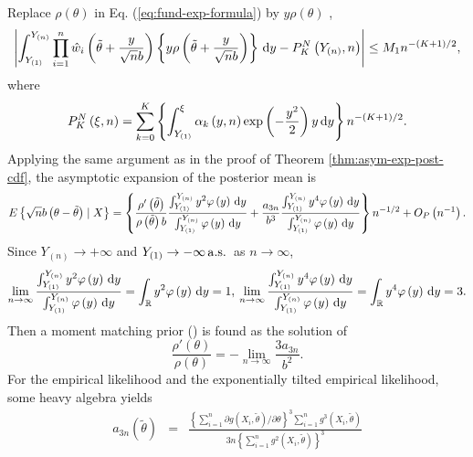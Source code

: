 \begin{example}
Replace $\rho\left(\theta\right)$ in Eq. (\ref{eq:fund-exp-formula})
by $y\rho\left(\theta\right)$ , 
\[
\left|\int_{Y_{\left(1\right)}}^{Y_{\left(n\right)}}\prod_{i=1}^{n}\hat{w}_{i}\left(\tilde{\theta}+\frac{y}{\sqrt{n}b}\right)\left\{ y\rho\left(\tilde{\theta}+\frac{y}{\sqrt{n}b}\right)\right\} \,\mathrm{d} y-P_{K}^{N}\left(Y_{\left(n\right)},n\right)\right|\le M_{1}n^{-\left(K+1\right)/2},
\]
where 
\[
P_{K}^{N}\left(\xi,n\right)=\sum_{k=0}^{K}\left\{ \int_{Y_{\left(1\right)}}^{\xi}\alpha_{k}\left(y,n\right)\exp\left(-\frac{y^{2}}{2}\right)y\,\mathrm{d} y\right\} n^{-\left(K+1\right)/2}.
\]
Applying the same argument as in the proof of Theorem \ref{thm:asym-exp-post-cdf},
the asymptotic expansion of the posterior mean is 
\[
E\left\{ \sqrt{n}b\left(\theta-\tilde{\theta}\right)\mid X\right\} =\left\{ \frac{\rho'\left(\tilde{\theta}\right)}{\rho\left(\tilde{\theta}\right)b}\frac{\int_{Y_{\left(1\right)}}^{Y_{\left(n\right)}}y^{2}\varphi\left(y\right)\,\mathrm{d} y}{\int_{Y_{\left(1\right)}}^{Y_{\left(n\right)}}\varphi\left(y\right)\,\mathrm{d} y}+\frac{a_{3n}}{b^{3}}\frac{\int_{Y_{\left(1\right)}}^{Y_{\left(n\right)}}y^{4}\varphi\left(y\right)\,\mathrm{d} y}{\int_{Y_{\left(1\right)}}^{Y_{\left(n\right)}}\varphi\left(y\right)\,\mathrm{d} y}\right\} n^{-1/2}+O_{P}\left(n^{-1}\right).
\]
Since $ Y_{\left( n \right )} \rightarrow + \infty $ and $ Y_{\left (1\right )} \rightarrow - \infty\,\mathrm{a.s.}\, $ as $n\rightarrow\infty$,
\[
	\lim_{n\rightarrow\infty} \frac{\int_{Y_{\left(1\right)}}^{Y_{\left(n\right)}}y^{2}\varphi\left(y\right)\,\mathrm{d} y}{\int_{Y_{\left(1\right)}}^{Y_{\left(n\right)}}\varphi\left(y\right)\,\mathrm{d} y} = \int_{\mathbb{R}} y^2 \varphi \left(y\right) \,\mathrm{d} y=1,\:
	\lim_{n\rightarrow\infty} \frac{\int_{Y_{\left(1\right)}}^{Y_{\left(n\right)}}y^{4}\varphi\left(y\right)\,\mathrm{d} y}{\int_{Y_{\left(1\right)}}^{Y_{\left(n\right)}}\varphi\left(y\right)\,\mathrm{d} y} = \int_{\mathbb{R}} y^4 \varphi \left(y\right) \,\mathrm{d} y=3.
\]
Then a moment matching prior (\cite{ghosh2011moment}) is found as  the
solution of 
\[
\frac{\rho'\left(\theta\right)}{\rho\left(\theta\right)}=-\lim_{n\rightarrow\infty}\frac{3a_{3n}}{b^{2}}.
\]
 For the empirical likelihood and the 
exponentially tilted empirical likelihood, some heavy algebra yields
\begin{eqnarray*}
a_{3n}\left(\tilde{\theta}\right) & = & \frac{\left\{ \sum_{i=1}^{n}\partial g\left(X_{i},\tilde{\theta}\right)/\partial\theta\right\} ^{3}\sum_{i=1}^{n}g^{3}\left(X_{i},\tilde{\theta}\right)}{3n\left\{ \sum_{i=1}^{n}g^{2}\left(X_{i},\tilde{\theta}\right)\right\} ^{3}}\\

\end{eqnarray*}
\end{example}
